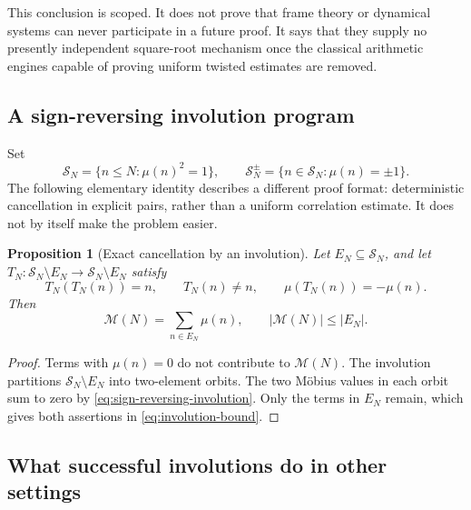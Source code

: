 \documentclass[11pt]{amsart}
\numberwithin{equation}{section}
\theoremstyle{plain}
\newtheorem{proposition}[theorem]{Proposition}
\theoremstyle{definition}
\theoremstyle{remark}
\newcommand{\Mertens}{\mathcal M}
\begin{document}
This conclusion is scoped.  It does not prove that frame theory or dynamical
systems can never participate in a future proof.  It says that they supply no
presently independent square-root mechanism once the classical arithmetic
engines capable of proving uniform twisted estimates are removed.

\subsection{A sign-reversing involution program}
\label{subsec:involution}

Set
\begin{equation}
  \mathcal S_N=\{n\leq N:\mu(n)^2=1\},
  \qquad
  \mathcal S_N^{\pm}=\{n\in\mathcal S_N:\mu(n)=\pm1\}.
  \label{eq:squarefree-bipartition}
\end{equation}
The following elementary identity describes a different proof format:
deterministic cancellation in explicit pairs, rather than a uniform
correlation estimate.  It does not by itself make the problem easier.

\begin{proposition}[Exact cancellation by an involution]
\label{prop:involution-cancellation}
Let \(E_N\subseteq\mathcal S_N\), and let
\(T_N:\mathcal S_N\setminus E_N\to\mathcal S_N\setminus E_N\) satisfy
\begin{equation}
  T_N(T_N(n))=n,
  \qquad
  T_N(n)\neq n,
  \qquad
  \mu(T_N(n))=-\mu(n).
  \label{eq:sign-reversing-involution}
\end{equation}
Then
\begin{equation}
  \Mertens(N)=\sum_{n\in E_N}\mu(n),
  \qquad
  |\Mertens(N)|\leq |E_N|.
  \label{eq:involution-bound}
\end{equation}
\end{proposition}

\begin{proof}
Terms with \(\mu(n)=0\) do not contribute to \(\Mertens(N)\).  The involution
partitions \(\mathcal S_N\setminus E_N\) into two-element orbits.  The two
M\"obius values in each orbit sum to zero by
\eqref{eq:sign-reversing-involution}.  Only the terms in \(E_N\) remain, which
gives both assertions in \eqref{eq:involution-bound}.
\end{proof}

\subsection{What successful involutions do in other settings}
\label{subsec:successful-involutions}
\end{document}
